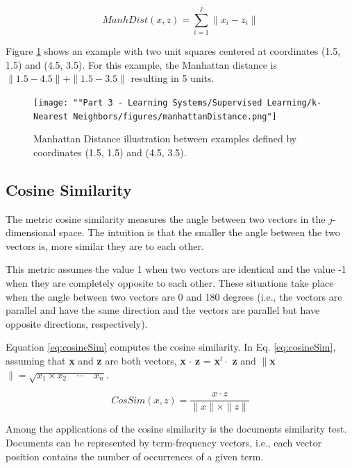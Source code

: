 \begin{equation}
    ManhDist(x,z) = \sum_{i=1}^{j} \|x_{i} - z_{i}\| 
    \label{eq:manDistance}
\end{equation}


Figure \ref{fig:manDistance} shows an example with two unit squares centered at coordinates (1.5, 1.5) and (4.5, 3.5). For this example, the Manhattan distance is $\|1.5 - 4.5\| + \|1.5 - 3.5\|$ resulting in 5 units.
 
\begin{figure}[h]
    \centering
    \texttt{[image: ""Part 3 - Learning Systems/Supervised Learning/k-Nearest Neighbors/figures/manhattanDistance.png"]}
    \caption{Manhattan Distance illustration between examples defined by coordinates (1.5, 1.5) and (4.5, 3.5).}
    \label{fig:manDistance}
\end{figure}

\subsection{Cosine Similarity}

The metric cosine similarity \cite{han2012mining} measures the angle between two vectors in the $j$-dimensional space. The intuition is that the smaller the angle between the two vectors is, more similar they are to each other.

This metric assumes the value 1 when two vectors are identical and the value -1 when they are completely opposite to each other. These situations take place when the angle between two vectors are 0 and 180 degrees (i.e., the vectors are parallel and have the same direction and the vectors are parallel but have opposite directions, respectively).

Equation \ref{eq:cosineSim} computes the cosine similarity. In Eq. \ref{eq:cosineSim}, assuming that \textbf{x} and \textbf{z} are both vectors, \textbf{x} $\cdot$ \textbf{z} = \textbf{x}$^t \cdot$ \textbf{z} and $\|$\textbf{x}$\| = \sqrt{x_1 \times x_2 \quad \cdots \quad x_n}$.

\begin{equation}
    CosSim(x,z) = \frac{x \cdot z}{\|x\| \times \|z\|}
    \label{eq:cosineSim}
\end{equation}

Among the applications of the cosine similarity is the documents similarity test. Documents can be represented by term-frequency vectors, i.e., each vector position contains the number of occurrences of a given term. 


